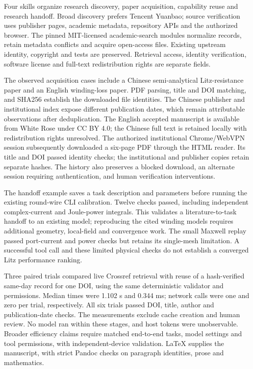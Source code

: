 \hypertarget{auto.07.research}{}
Four skills organize research discovery, paper acquisition, capability reuse and research handoff. Broad discovery prefers Tencent Yuanbao; source verification uses publisher pages, academic metadata, repository APIs and the authorized browser. The pinned MIT-licensed academic-search modules normalize records, retain metadata conflicts and acquire open-access files. Existing upstream identity, copyright and tests are preserved. Retrieval access, identity verification, software license and full-text redistribution rights are separate fields. \cite{ACADEMICSEARCH}

\hypertarget{auto.07.acquisition}{}
The observed acquisition cases include a Chinese semi-analytical Litz-resistance paper and an English winding-loss paper. PDF parsing, title and DOI matching, and SHA256 establish the downloaded file identities. The Chinese publisher and institutional index expose different publication dates, which remain attributable observations after deduplication. The English accepted manuscript is available from White Rose under CC BY 4.0; the Chinese full text is retained locally with redistribution rights unresolved. The authorized institutional Chrome/WebVPN session subsequently downloaded a six-page PDF through the HTML reader. Its title and DOI passed identity checks; the institutional and publisher copies retain separate hashes. The history also preserves a blocked download, an alternate session requiring authentication, and human verification interventions. \cite{C01,ZHU2026}

\hypertarget{auto.07.handoff}{}
The handoff example saves a task description and parameters before running the existing round-wire CLI calibration. Twelve checks passed, including independent complex-current and Joule-power integrals. This validates a literature-to-task handoff to an existing model; reproducing the cited winding models requires additional geometry, local-field and convergence work. The small Maxwell replay passed port-current and power checks but retains its single-mesh limitation. A successful tool call and these limited physical checks do not establish a converged Litz performance ranking.

\hypertarget{auto.07.evaluation}{}
Three paired trials compared live Crossref retrieval with reuse of a hash-verified same-day record for one DOI, using the same deterministic validator and permissions. Median times were 1.102 s and 0.344 ms; network calls were one and zero per trial, respectively. All six trials passed DOI, title, author and publication-date checks. The measurements exclude cache creation and human review. No model ran within these stages, and host tokens were unobservable. Broader efficiency claims require matched end-to-end tasks, model settings and tool permissions, with independent-device validation. LaTeX supplies the manuscript, with strict Pandoc checks on paragraph identities, prose and mathematics.

